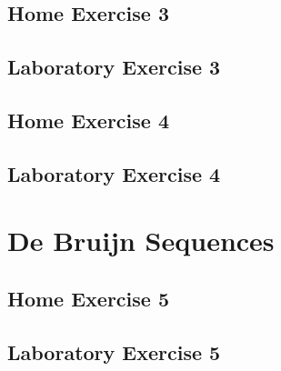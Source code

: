 \documentclass{article}
\begin{document}
\subsection{Home Exercise 3}
\subsection{Laboratory Exercise 3}
\subsection{Home Exercise 4}
\subsection{Laboratory Exercise 4}


\section{De Bruijn Sequences}

\subsection{Home Exercise 5}
\subsection{Laboratory Exercise 5}
\end{document}
